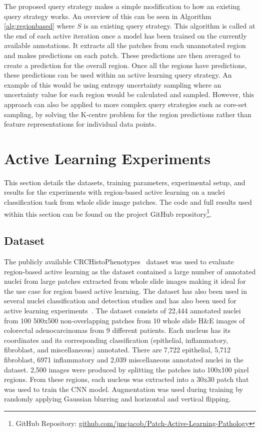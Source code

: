 The proposed query strategy makes a simple modification to how an existing query strategy works. An overview of this can be seen in Algorithm \ref{alg:regionbased} where \(S\) is an existing query strategy. This algorithm is called at the end of each active iteration once a model has been trained on the currently available annotations. It extracts all the patches from each unannotated region and makes predictions on each patch. These predictions are then averaged to create a prediction for the overall region. Once all the regions have predictions, these predictions can be used within an active learning query strategy. An example of this would be using entropy uncertainty sampling where an uncertainty value for each region would be calculated and sampled. However, this approach can also be applied to more complex query strategies such as core-set sampling, by solving the K-centre problem for the region predictions rather than feature representations for individual data points.



\section{Active Learning Experiments}
This section details the datasets, training parameters, experimental setup, and results for the experiments with region-based active learning on a nuclei classification task from whole slide image patches. The code and full results used within this section can be found on the project GitHub repository\footnote{GitHub Repository: \url{github.com/jmcjacob/Patch-Active-Learning-Pathology}}.

\subsection{Dataset}
The publicly available CRCHistoPhenotypes~\citep{sirinukunwattana2016locality} dataset was used to evaluate region-based active learning as the dataset contained a large number of annotated nuclei from large patches extracted from whole slide images making it ideal for the use case for region based active learning. The dataset has also been used in several nuclei classification and detection studies and has also been used for active learning experiments~\citep{shao2018deep}. The dataset consists of 22,444 annotated nuclei from 100 500x500 non-overlapping patches from 10 whole slide H\&E images of colorectal adenocarcinomas from 9 different patients. Each nucleus has its coordinates and its corresponding classification (epithelial, inflammatory, fibroblast, and miscellaneous) annotated. There are 7,722 epithelial, 5,712 fibroblast, 6971 inflammatory and 2,039 miscellaneous annotated nuclei in the dataset. 2,500 images were produced by splitting the patches into 100x100 pixel regions. From these regions, each nucleus was extracted into a 30x30 patch that was used to train the CNN model. Augmentation was used during training by randomly applying Gaussian blurring and horizontal and vertical flipping.

